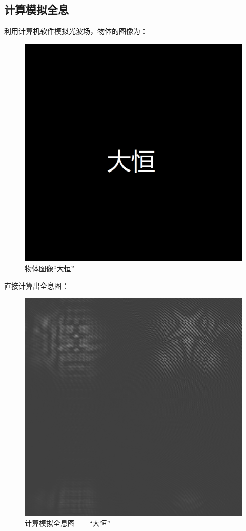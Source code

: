 \documentclass{WHUReport}
\begin{document}
\begin{multicols}{2}
	\section{计算模拟全息}
	利用计算机软件模拟光波场，物体的图像为：
	\begin{figure}[H]
		\centering
		\includegraphics[width=.8\linewidth]{figs/7.png}
		\caption{物体图像“大恒”}
	\end{figure}
	直接计算出全息图：
	\begin{figure}[H]
		\centering
		\includegraphics[width=.8\linewidth]{figs/8.png}
		\caption{计算模拟全息图——“大恒”}
	\end{figure}

\end{multicols}
\end{document}

